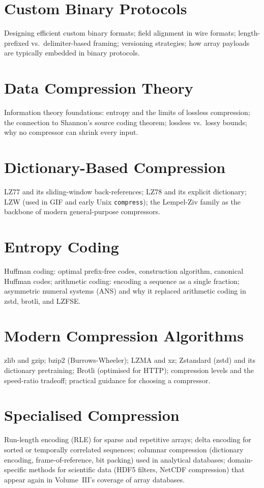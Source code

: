 \chapter{Custom Binary Protocols}
\label{ch:binary-protocols}

Designing efficient custom binary formats; field alignment in wire formats;
length-prefixed vs.\ delimiter-based framing; versioning strategies; how
array payloads are typically embedded in binary protocols.

\chapter{Data Compression Theory}
\label{ch:compression-theory}

Information theory foundations: entropy and the limits of lossless
compression; the connection to Shannon's source coding theorem; lossless
vs.\ lossy bounds; why no compressor can shrink every input.

\chapter{Dictionary-Based Compression}
\label{ch:dictionary-compression}

LZ77 and its sliding-window back-references; LZ78 and its explicit
dictionary; LZW (used in GIF and early Unix \texttt{compress}); the
Lempel-Ziv family as the backbone of modern general-purpose compressors.

\chapter{Entropy Coding}
\label{ch:entropy-coding}

Huffman coding: optimal prefix-free codes, construction algorithm, canonical
Huffman codes; arithmetic coding: encoding a sequence as a single fraction;
asymmetric numeral systems (ANS) and why it replaced arithmetic coding in
zstd, brotli, and LZFSE.

\chapter{Modern Compression Algorithms}
\label{ch:modern-compression}

zlib and gzip; bzip2 (Burrows-Wheeler); LZMA and xz; Zstandard (zstd) and
its dictionary pretraining; Brotli (optimised for HTTP); compression levels
and the speed-ratio tradeoff; practical guidance for choosing a compressor.

\chapter{Specialised Compression}
\label{ch:specialised-compression}

Run-length encoding (RLE) for sparse and repetitive arrays; delta encoding
for sorted or temporally correlated sequences; columnar compression
(dictionary encoding, frame-of-reference, bit packing) used in analytical
databases; domain-specific methods for scientific data (HDF5 filters, NetCDF
compression) that appear again in Volume~III's coverage of array databases.